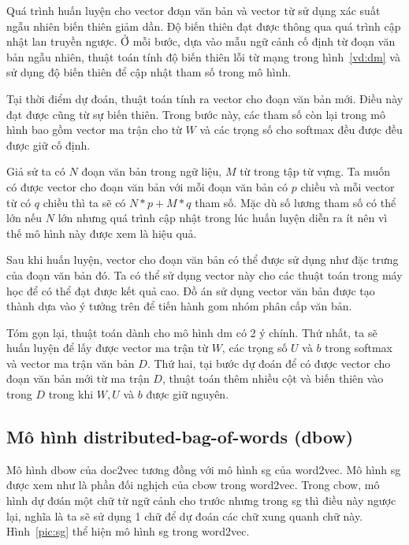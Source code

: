 Quá trình huấn luyện cho vector đơạn văn bản và vector từ sử dụng xác suất ngẫu nhiên biến thiên giảm dần.
Độ biến thiên đạt được thông qua quá trình cập nhật lan truyền ngược.
Ở mỗi bước, dựa vào mẫu ngữ cảnh cố định từ đoạn văn bản ngẫu nhiên, thuật toán tính độ biến thiên lỗi từ mạng trong hình~\ref{vd:dm} và sử dụng độ biến thiên để cập nhật tham số trong mô hình.

Tại thời điểm dự đoán, thuật toán tính ra vector cho đoạn văn bản mới.
Điều này đạt được cũng từ sự biến thiên.
Trong bước này, các tham số còn lại trong mô hình bao gồm vector ma trận cho từ $W$ và các trọng số cho softmax đều được đều được giữ cố định.

Giả sử ta có $N$ đoạn văn bản trong ngữ liệu, $M$ từ trong tập từ vựng.
Ta muốn có được vector cho đoạn văn bản với mỗi đoạn văn bản có $p$ chiều và mỗi vector từ có $q$ chiều thì ta sẽ có $N * p + M * q$ tham số.
Mặc dù số lương tham số có thể lớn nếu $N$ lớn nhưng quá trình cập nhật trong lúc huấn luyện diễn ra ít nên vì thế mô hình này được xem là hiệu quả.

Sau khi huấn luyện, vector cho đoạn văn bản có thể được sử dụng như đặc trưng của đoạn văn bản đó.
Ta có thể sử dụng vector này cho các thuật toán trong máy học để có thể đạt được kết quả cao.
Đồ án sử dụng vector văn bản được tạo thành dựa vào ý tưởng trên để tiến hành gom nhóm phân cấp văn bản.

Tóm gọn lại, thuật toán dành cho mô hình dm có 2 ý chính.
Thứ nhất, ta sẽ huấn luyện để lấy được vector ma trận từ $W$, các trọng số $U$ và $b$ trong softmax và vector ma trận văn bản $D$.
Thứ hai, tại bước dự đoán để có được vector cho đoạn văn bản mới từ ma trận $D$, thuật toán thêm nhiều cột và biến thiên vào trong $D$ trong khi $W, U$ và $b$ được giữ nguyên.

\subsection{Mô hình distributed-bag-of-words (dbow)}
Mô hình dbow của doc2vec tương đồng với mô hình sg của word2vec.
Mô hình sg được xem như là phần đối nghịch của cbow trong word2vec.
Trong cbow, mô hình dự đơán một chữ từ ngữ cảnh cho trước nhưng trong sg thì điều này ngược lại, nghĩa là ta sẽ sử dụng 1 chữ để dự đoán các chữ xung quanh chữ này.
Hình~\ref{pic:sg} thể hiện mô hình sg trong word2vec.

